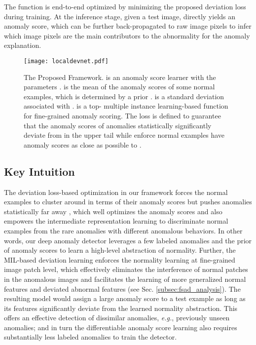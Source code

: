 \documentclass[10pt,journal,compsoc]{IEEEtran}
\newcommand{\eg}{\textit{e.g.}}
\begin{document}
The function  is end-to-end optimized by minimizing the proposed deviation loss  during training. At the inference stage, given a test image,  directly yields an anomaly score, which can be further back-propagated to raw image pixels to infer which image pixels are the main contributors to the abnormality for the anomaly explanation.
 
\begin{figure*}[h!]
  \centering
    \texttt{[image: localdevnet.pdf]}
  \caption{The Proposed Framework.  is an anomaly score learner with the parameters .  is the mean of the anomaly scores of some normal examples, which is determined by a prior .  is a standard deviation associated with .  is a top- multiple instance learning-based function for fine-grained anomaly scoring. The loss  is defined to guarantee that the anomaly scores of anomalies statistically significantly deviate from  in the upper tail while enforce normal examples have anomaly scores as close as possible to . }
  \label{fig:framework}
\end{figure*}


\subsection{Key Intuition}

The deviation loss-based optimization in our framework forces the normal examples to cluster around  in terms of their anomaly scores but pushes anomalies statistically far away , which well optimizes the anomaly scores and also empowers the intermediate representation learning to discriminate normal examples from the rare anomalies with different anomalous behaviors. In other words, our deep anomaly detector leverages a few labeled anomalies and the prior of anomaly scores to learn a high-level abstraction of normality. Further, the MIL-based deviation learning enforces the normality learning at fine-grained image patch level, which effectively eliminates the interference of normal patches in the anomalous images and facilitates the learning of more generalized normal features and deviated abnormal features (see Sec. \ref{subsec:fsad_analysis}). The resulting model would assign a large anomaly score to a test example as long as its features significantly deviate from the learned normality abstraction. This offers an effective detection of dissimilar anomalies, \eg, previously unseen anomalies; and in turn the differentiable anomaly score learning also requires substantially less labeled anomalies to train the detector.
\end{document}
